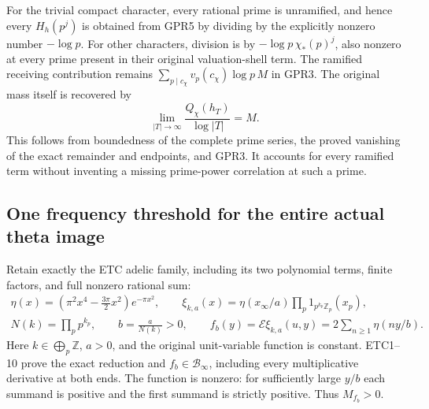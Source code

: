 For the trivial compact character, every rational prime is
unramified, and hence every $H_h(p^j)$ is obtained from GPR5
by dividing by the explicitly nonzero number $-\log p$.
For other characters, division is by
$-\log p\,\chi_*(p)^j$, also nonzero at every prime present
in their original valuation-shell term.
The ramified receiving contribution remains
$\sum_{p\mid c_\chi}v_p(c_\chi)\log p\,M$ in GPR3.
The original mass itself is recovered by
\begin{equation}\tag{GPR6}
 \lim_{|T|\to\infty}\frac{Q_\chi(h_T)}{\log|T|}=M.
\end{equation}
This follows from boundedness of the complete prime series,
the proved vanishing of the exact remainder and endpoints,
and GPR3. It accounts for every ramified term without
inventing a missing prime-power correlation at such a prime.

\subsection{One frequency threshold for the entire actual theta image}

Retain exactly the ETC adelic family, including its two polynomial
terms, finite factors, and full nonzero rational sum:
\begin{equation}\tag{GPR7}
 \begin{gathered}
 \eta(x)=
 \left(\pi^2x^4-\frac{3\pi}{2}x^2\right)e^{-\pi x^2},\qquad
 \xi_{k,a}(x)=\eta(x_\infty/a)\prod_p1_{p^{k_p}\mathbb Z_p}(x_p),\\
 N(k)=\prod_pp^{k_p},\qquad
 b=\frac a{N(k)}>0,\qquad
 f_b(y)=\mathcal E\xi_{k,a}(u,y)
       =2\sum_{n\ge1}\eta(ny/b).
 \end{gathered}
\end{equation}
Here $k\in\bigoplus_p\mathbb Z$, $a>0$, and the original
unit-variable function is constant. ETC1--10 prove the exact
reduction and $f_b\in\mathcal B_\infty$, including every
multiplicative derivative at both ends.
The function is nonzero: for sufficiently large $y/b$ each
summand is positive and the first summand is strictly positive.
Thus $M_{f_b}>0$.

